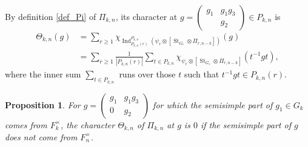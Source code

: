 \documentclass[reqno]{amsart}
\newtheorem{proposition}[theorem]{Proposition}
\theoremstyle{definition}
\theoremstyle{remark}
\numberwithin{equation}{section}
\DeclareMathOperator{\Ind}{Ind}
\DeclareMathOperator{\St}{St}
\newcommand{\bbsm}{\left (\begin{smallmatrix}}      \newcommand{\besm}{\end{smallmatrix}\right )}
\begin{document}
By definition \ref{def_Pi} of $\Pi_{k,n}$, its character  at $g = \bbsm g_1 & g_1g_3\\ & g_2 \besm\in P_{k,n}$ is 
\begin{align} \label{eq:formula_char_Pi_k_n}
    \nonumber \Theta_{k,n}(g) &= \sum_{r \geq 1}  \chi_{\Ind_{P_{k,n}(r)}^{P_{k,n}} ( \psi_r \otimes [\St_{G_r} \otimes \Pi_{r,n-k}])
    }(g) \\ &= \sum_{r \geq 1}
\tfrac{1}{|P_{k,n}(r)|} \sum_{t \in P_{k,n}}
\chi_{\psi_r \otimes [\St_{G_r} \otimes \Pi_{r,n-k}]} (t^{-1} g t),
\end{align} 
where the inner sum $\sum_{t \in P_{k,n}}$ runs over those $t$ such that $t^{-1} g t \in P_{k,n}(r)$. 

\begin{proposition} \label{char_Pi_k_n_not_semisimple}
For $g = \bbsm g_1 & g_1 g_3 \\ 0 & g_2 \besm$ for which the semisimple part of $g_1 \in G_k$ comes from $F_k^\times$, the character $\Theta_{k,n}$ of $\Pi_{k,n}$ at $g$ is $0$ if the semisimple part of $g$ does not come from $F_n^\times$.
\end{proposition} 
\end{document}
